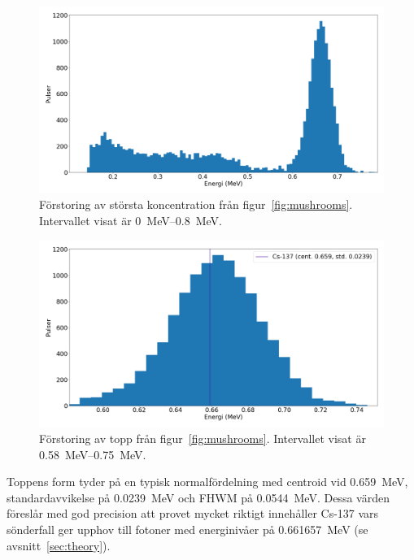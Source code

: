\begin{figure}[!ht]
    \centering
    \includegraphics[width=\textwidth, keepaspectratio]{../images/mushrooms_zoom.png}
    \caption{
        Förstoring av största koncentration från figur~\ref{fig:mushrooms}.
        Intervallet visat är \qtyrange{0}{0.8}{\MeV}.
    }
    \label{fig:mushroomszoom}
\end{figure}

\begin{figure}[!ht]
    \centering
    \includegraphics[width=\textwidth, keepaspectratio]{../images/mushrooms_top.png}
    \caption{
        Förstoring av topp från figur~\ref{fig:mushrooms}.
        Intervallet visat är \qtyrange{0.58}{0.75}{\MeV}.
    }
    \label{fig:mushroomstop}
\end{figure}

Toppens form tyder på en typisk normalfördelning med centroid vid
\qty{0.659}{\MeV}, standardavvikelse på \qty{0.0239}{\MeV} och FHWM på
\qty{0.0544}{\MeV}. Dessa värden föreslår med god precision att provet mycket
riktigt innehåller Cs-137 vars sönderfall ger upphov till fotoner med
energinivåer på \qty{0.661657}{\MeV} (se avsnitt~\ref{sec:theory}).

